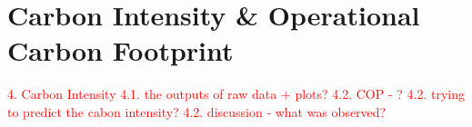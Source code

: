 \section{Carbon Intensity \& Operational Carbon Footprint}
\noindent

\textcolor{red}{4. Carbon Intensity 
4.1. the outputs of raw data + plots?
4.2. COP - ?
4.2. trying to predict the cabon intensity?
4.2. discussion - what was observed?}